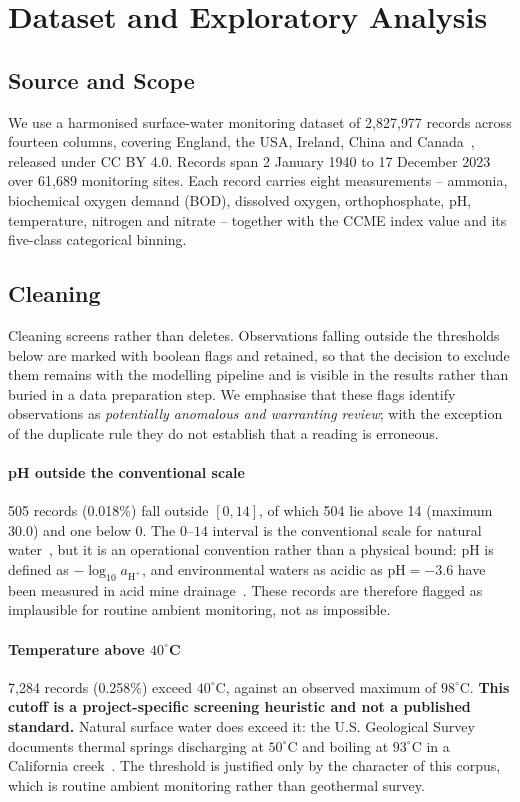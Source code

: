 \section{Dataset and Exploratory Analysis}
\label{sec:data}

\subsection{Source and Scope}
We use a harmonised surface-water monitoring dataset of 2{,}827{,}977 records across
fourteen columns, covering England, the USA, Ireland, China and
Canada~\cite{karim2025waterquality}, released under CC BY 4.0. Records span
2 January 1940 to 17 December 2023 over 61{,}689 monitoring sites. Each record carries
eight measurements -- ammonia, biochemical oxygen demand (BOD), dissolved oxygen,
orthophosphate, pH, temperature, nitrogen and nitrate -- together with the CCME index
value and its five-class categorical binning.

\subsection{Cleaning}
\label{sec:cleaning}
Cleaning screens rather than deletes. Observations falling outside the thresholds below
are marked with boolean flags and retained, so that the decision to exclude them remains
with the modelling pipeline and is visible in the results rather than buried in a data
preparation step. We emphasise that these flags identify observations as \emph{potentially
anomalous and warranting review}; with the exception of the duplicate rule they do not
establish that a reading is erroneous.

\paragraph{pH outside the conventional scale}
505 records (0.018\%) fall outside $[0,14]$, of which 504 lie above 14 (maximum 30.0) and
one below 0. The $0$--$14$ interval is the conventional scale for natural
water~\cite{usgs_ph_water}, but it is an operational convention rather than a physical
bound: pH is defined as $-\log_{10} a_{\mathrm{H}^+}$, and environmental waters as acidic
as $\mathrm{pH} = -3.6$ have been measured in acid mine
drainage~\cite{nordstrom2000negativeph}. These records are therefore flagged as
implausible for routine ambient monitoring, not as impossible.

\paragraph{Temperature above $40^\circ$C}
7{,}284 records (0.258\%) exceed $40^\circ$C, against an observed maximum of $98^\circ$C.
\textbf{This cutoff is a project-specific screening heuristic and not a published
standard.} Natural surface water does exceed it: the U.S. Geological Survey documents
thermal springs discharging at $50^\circ$C and boiling at $93^\circ$C in a California
creek~\cite{farrar2007hotcreek}. The threshold is justified only by the character of this
corpus, which is routine ambient monitoring rather than geothermal survey.

